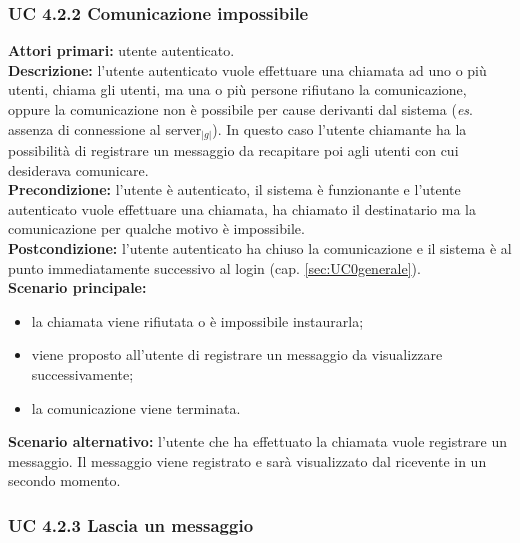 \subsubsection{UC 4.2.2 Comunicazione impossibile}
\noindent
\textbf{Attori primari:} utente autenticato.\\
\textbf{Descrizione:} l'utente autenticato vuole effettuare una chiamata ad uno o più utenti, chiama gli utenti, ma una o più persone rifiutano la comunicazione, oppure la comunicazione non è possibile per cause derivanti dal sistema (\emph{es}. assenza di connessione al server$_{|g|}$). In questo caso l'utente chiamante ha la possibilità di registrare un messaggio da recapitare poi agli utenti con cui desiderava comunicare.\\
\textbf{Precondizione:} l'utente è autenticato, il sistema è funzionante e l'utente autenticato vuole effettuare una chiamata, ha chiamato il destinatario ma la comunicazione per qualche motivo è impossibile.\\
\textbf{Postcondizione:} l'utente autenticato ha chiuso la comunicazione e il sistema è al punto immediatamente successivo al login (cap. \ref{sec:UC0generale}).\\
\textbf{Scenario principale:}
\begin{itemize}
\item la chiamata viene rifiutata o è impossibile instaurarla;
\item viene proposto all'utente di registrare un messaggio da visualizzare successivamente;
\item la comunicazione viene terminata.
\end{itemize}
\textbf{Scenario alternativo: }l'utente che ha effettuato la chiamata vuole registrare un messaggio. Il messaggio viene registrato e sarà visualizzato dal ricevente in un secondo momento.

\newpage

\subsubsection{UC 4.2.3 Lascia un messaggio }

